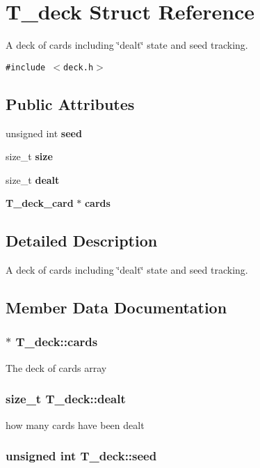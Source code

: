\section{T\_\-deck Struct Reference}
\label{structT__deck}
A deck of cards including \char`\"{}dealt\char`\"{} state and seed tracking. 


{\tt \#include $<$deck.h$>$}

\subsection*{Public Attributes}
\begin{CompactItemize}
\item 
unsigned int {\bf seed}
\item 
size\_\-t {\bf size}
\item 
size\_\-t {\bf dealt}
\item 
{\bf T\_\-deck\_\-card} $\ast$ {\bf cards}
\end{CompactItemize}


\subsection{Detailed Description}
A deck of cards including \char`\"{}dealt\char`\"{} state and seed tracking.



\subsection{Member Data Documentation}
\subsubsection{$\ast$ T\_\-deck::cards}\label{structT__deck_m3}


The deck of cards array 
\subsubsection{\setlength{\rightskip}{0pt plus 5cm}size\_\-t T\_\-deck::dealt}\label{structT__deck_m2}


how many cards have been dealt 
\subsubsection{\setlength{\rightskip}{0pt plus 5cm}unsigned int T\_\-deck::seed}\label{structT__deck_m0}


